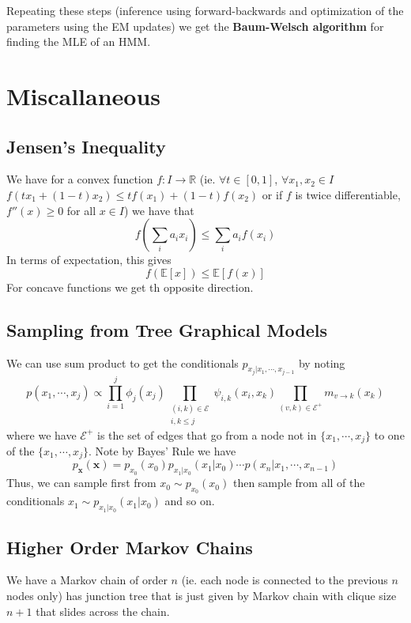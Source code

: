 \documentclass[9pt]{article}
\begin{document}
\begin{multicols}{2}
Repeating these steps (inference using forward-backwards and 
optimization of the parameters using the EM updates) we get the
\textbf{Baum-Welsch algorithm} for finding the MLE of an
HMM.

\section{Miscallaneous}

\subsection{Jensen's Inequality} We have for a convex function $f:I \to \mathbb{R}$ (ie. $\forall t \in [0,1]$, $\forall x_1,x_2 \in I$ $f(tx_1+(1-t)x_2) \le tf(x_1)+(1-t)f(x_2)$ or if $f$ is twice differentiable, $f''(x) \ge 0$ for all $x \in I$) we have that
$$f\left(\sum_{i}a_ix_i\right) \le \sum_{i}a_if(x_i)$$
In terms of expectation, this gives $$f(\mathbb{E}[x]) \le \mathbb{E}[f(x)]$$
For concave functions we get th opposite direction.

\subsection{Sampling from Tree Graphical Models} We can use sum product to get the conditionals $p_{x_j|x_{1},\cdots,x_{j-1}}$  by noting
$$p(x_{1},\cdots,x_j) \propto
\prod_{i=1}^{j}\phi_j(x_j)\prod_{\substack{(i,k) \in \mathcal{E} \\
i, k \le j}} \psi_{i,k}(x_i,x_k) \prod_{(v,k) \in \mathcal{E}^{+}}m_{v \to k}(x_k)$$ where we have $\mathcal{E}^{+}$ is the set of edges that go from a
node not in $\{x_1,\cdots,x_j\}$ to one of the $\{x_1,\cdots,x_j\}$. 
Note by Bayes' Rule we
have $$p_{\mathbf{x}}(\mathbf{x})=p_{x_0}(x_0)p_{x_1|x_0}(x_1|x_0)\cdots p(x_{n}|x_1,\cdots,x_{n-1})$$ Thus, we can sample first from 
$x_0 \sim p_{x_0}(x_0)$ then sample from all of the conditionals
$x_1 \sim p_{x_1|x_0}(x_1|x_0)$ and so on.

\subsection{Higher Order Markov Chains}
We have a Markov chain of order $n$ (ie. each node is connected to 
the previous $n$ nodes only) has junction tree that is just given
by Markov chain with clique size $n+1$ that slides across the 
chain.
% 
% 
\end{multicols}
\end{document}
